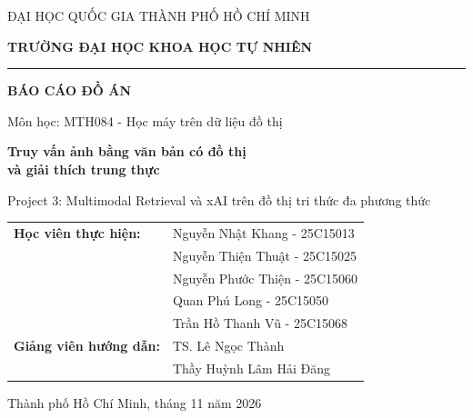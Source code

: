 \begin{titlepage}
\onecolumn
\centering
{\large ĐẠI HỌC QUỐC GIA THÀNH PHỐ HỒ CHÍ MINH\par}
{\large\bfseries TRƯỜNG ĐẠI HỌC KHOA HỌC TỰ NHIÊN\par}
\vspace{4mm}
\rule{0.6\textwidth}{0.6pt}\par
\vspace{30mm}
{\Large\bfseries BÁO CÁO ĐỒ ÁN\par}
\vspace{4mm}
{\large Môn học: MTH084 - Học máy trên dữ liệu đồ thị\par}
\vspace{18mm}
{\LARGE\bfseries Truy vấn ảnh bằng văn bản có đồ thị\\[2mm]
và giải thích trung thực\par}
\vspace{10mm}
\begin{minipage}{0.82\textwidth}
\centering\large
Project 3: Multimodal Retrieval và xAI trên đồ thị tri thức đa phương thức
\end{minipage}
\vfill
\begin{tabular}{ll}
\textbf{Học viên thực hiện:} & Nguyễn Nhật Khang - 25C15013 \\
                              & Nguyễn Thiện Thuật - 25C15025 \\
                              & Nguyễn Phước Thiện - 25C15060 \\
                              & Quan Phú Long - 25C15050 \\
                              & Trần Hồ Thanh Vũ - 25C15068 \\[2mm]
\textbf{Giảng viên hướng dẫn:} & TS. Lê Ngọc Thành \\
                              & Thầy Huỳnh Lâm Hải Đăng \\
\end{tabular}
\vspace{20mm}

{\large Thành phố Hồ Chí Minh, tháng 11 năm 2026\par}
\end{titlepage}
\twocolumn
\setcounter{page}{1}
